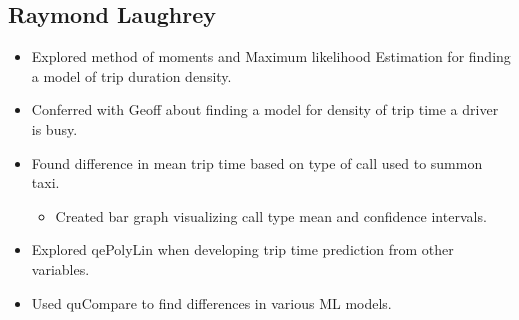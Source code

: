\documentclass{article}
\numberwithin{equation}{section}
\begin{document}
\subsection{Raymond Laughrey}
\begin{itemize}
    \item Explored method of moments and Maximum likelihood Estimation for finding a model of trip duration density. 
    \item Conferred with Geoff about finding a model for density of trip time a driver is busy.
    \item Found difference in mean trip time based on type of call used to summon taxi.
    \begin{itemize}
        \item Created bar graph visualizing call type mean and confidence intervals.
    \end{itemize}
    \item Explored qePolyLin when developing trip time prediction from other variables. 
    \item Used quCompare to find differences in various ML models.

\end{itemize}
\end{document}
